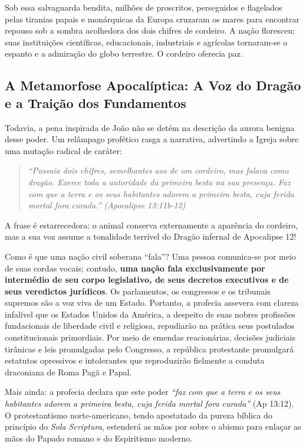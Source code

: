 Sob essa salvaguarda bendita, milhões de proscritos, perseguidos e flagelados pelas tiranias papais e monárquicas da Europa cruzaram os mares para encontrar repouso sob a sombra acolhedora dos dois chifres de cordeiro. A nação floresceu; suas instituições científicas, educacionais, industriais e agrícolas tornaram-se o espanto e a admiração do globo terrestre. O cordeiro oferecia paz.



\subsection{A Metamorfose Apocalíptica: A Voz do Dragão e a Traição dos Fundamentos}


Todavia, a pena inspirada de João não se detém na descrição da aurora benigna desse poder. Um relâmpago profético rasga a narrativa, advertindo a Igreja sobre uma mutação radical de caráter:


\begin{quote}
\itshape \textit{``Possuía dois chifres, semelhantes aos de um cordeiro, mas falava como dragão. Exerce toda a autoridade da primeira besta na sua presença. Faz com que a terra e os seus habitantes adorem a primeira besta, cuja ferida mortal fora curada.''} (Apocalipse 13:11b-12)
\end{quote}


A frase é estarrecedora: o animal conserva externamente a aparência do cordeiro, mas a sua voz assume a tonalidade terrível do Dragão infernal de Apocalipse 12!

Como é que uma nação civil soberana ``fala''? Uma pessoa comunica-se por meio de suas cordas vocais; contudo, \textbf{uma nação fala exclusivamente por intermédio de seu corpo legislativo, de seus decretos executivos e de seus veredictos jurídicos}. Os parlamentos, os congressos e os tribunais supremos são a voz viva de um Estado. Portanto, a profecia assevera com clareza infalível que os Estados Unidos da América, a despeito de suas nobres profissões fundacionais de liberdade civil e religiosa, repudiarão na prática seus postulados constitucionais primordiais. Por meio de emendas reacionárias, decisões judiciais tirânicas e leis promulgadas pelo Congresso, a república protestante promulgará estatutos opressivos e intolerantes que reproduzirão fielmente a conduta draconiana de Roma Pagã e Papal.

Mais ainda: a profecia declara que este poder \textit{``faz com que a terra e os seus habitantes adorem a primeira besta, cuja ferida mortal fora curada''} (Ap 13:12). O protestantismo norte-americano, tendo apostatado da pureza bíblica do princípio do \textit{Sola Scriptura}, estenderá as mãos por sobre o abismo para enlaçar as mãos do Papado romano e do Espiritismo moderno.

